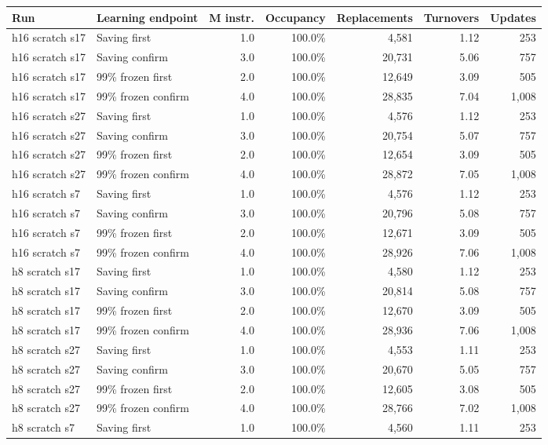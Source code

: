 \documentclass[10pt]{article}
\begin{document}
\begin{center}
\scriptsize
\begin{longtable}{llrrrrr}
\toprule
Run & Learning endpoint & M instr. & Occupancy & Replacements & Turnovers & Updates \\
\midrule
\endhead
h16 scratch s17 & Saving first & 1.0 & 100.0\% & 4,581 & 1.12 & 253 \\
h16 scratch s17 & Saving confirm & 3.0 & 100.0\% & 20,731 & 5.06 & 757 \\
h16 scratch s17 & 99\% frozen first & 2.0 & 100.0\% & 12,649 & 3.09 & 505 \\
h16 scratch s17 & 99\% frozen confirm & 4.0 & 100.0\% & 28,835 & 7.04 & 1,008 \\
h16 scratch s27 & Saving first & 1.0 & 100.0\% & 4,576 & 1.12 & 253 \\
h16 scratch s27 & Saving confirm & 3.0 & 100.0\% & 20,754 & 5.07 & 757 \\
h16 scratch s27 & 99\% frozen first & 2.0 & 100.0\% & 12,654 & 3.09 & 505 \\
h16 scratch s27 & 99\% frozen confirm & 4.0 & 100.0\% & 28,872 & 7.05 & 1,008 \\
h16 scratch s7 & Saving first & 1.0 & 100.0\% & 4,576 & 1.12 & 253 \\
h16 scratch s7 & Saving confirm & 3.0 & 100.0\% & 20,796 & 5.08 & 757 \\
h16 scratch s7 & 99\% frozen first & 2.0 & 100.0\% & 12,671 & 3.09 & 505 \\
h16 scratch s7 & 99\% frozen confirm & 4.0 & 100.0\% & 28,926 & 7.06 & 1,008 \\
h8 scratch s17 & Saving first & 1.0 & 100.0\% & 4,580 & 1.12 & 253 \\
h8 scratch s17 & Saving confirm & 3.0 & 100.0\% & 20,814 & 5.08 & 757 \\
h8 scratch s17 & 99\% frozen first & 2.0 & 100.0\% & 12,670 & 3.09 & 505 \\
h8 scratch s17 & 99\% frozen confirm & 4.0 & 100.0\% & 28,936 & 7.06 & 1,008 \\
h8 scratch s27 & Saving first & 1.0 & 100.0\% & 4,553 & 1.11 & 253 \\
h8 scratch s27 & Saving confirm & 3.0 & 100.0\% & 20,670 & 5.05 & 757 \\
h8 scratch s27 & 99\% frozen first & 2.0 & 100.0\% & 12,605 & 3.08 & 505 \\
h8 scratch s27 & 99\% frozen confirm & 4.0 & 100.0\% & 28,766 & 7.02 & 1,008 \\
h8 scratch s7 & Saving first & 1.0 & 100.0\% & 4,560 & 1.11 & 253 \\

\end{longtable}
\end{center}
\end{document}
